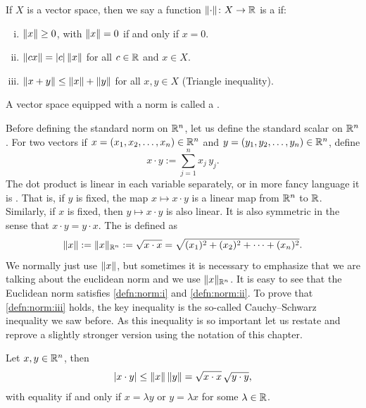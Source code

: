 \begin{defn}
If $X$ is a vector space, then we say
a function $\lVert {\cdot} \rVert \colon X \to {\mathbb{R}}$ is a
\emph{} if:
\begin{enumerate}[(i)]
\item \label{defn:norm:i} $\lVert {x} \rVert \geq 0$, with $\lVert {x} \rVert=0$ if and only if $x=0$.
\item \label{defn:norm:ii} $\lVert {cx} \rVert = \lvert {c} \rvert \, \lVert {x} \rVert$ for all $c \in {\mathbb{R}}$ and $x \in X$.
\item \label{defn:norm:iii} $\lVert {x+y} \rVert \leq \lVert {x} \rVert+\lVert {y} \rVert$ for all $x,y \in X$
\qquad (Triangle inequality).
\end{enumerate}
A vector space equipped with a norm is called a
\emph{}.
\end{defn}

Before defining the standard norm on ${\mathbb{R}}^n$, let us
define the standard 
scalar \emph{} on ${\mathbb{R}}^n$.  For two vectors
if $x=(x_1,x_2,\ldots,x_n) \in {\mathbb{R}}^n$
and $y=(y_1,y_2,\ldots,y_n) \in {\mathbb{R}}^n$, define
\begin{equation*}
x \cdot y := \sum_{j=1}^n x_j\, y_j .
\end{equation*}
The dot product is linear in each variable
separately, or in more fancy language it is \emph{}.
That is,
if $y$ is fixed, the map $x \mapsto x \cdot y$ is a linear map from
${\mathbb{R}}^n$ to ${\mathbb{R}}$.  Similarly, if $x$ is fixed, then
$y \mapsto x \cdot y$ is also linear.
It is also symmetric in the sense that $x \cdot y = y \cdot x$.
The \emph{} is defined as
\begin{equation*}
\lVert {x} \rVert := \lVert {x} \rVert_{{\mathbb{R}}^n} := \sqrt{x \cdot x} = \sqrt{(x_1)^2+(x_2)^2 + \cdots + (x_n)^2}.
\end{equation*}
We normally just use $\lVert {x} \rVert$, but sometimes it is necessary to
emphasize that we are talking about the euclidean norm and we use
$\lVert {x} \rVert_{{\mathbb{R}}^n}$.
It is easy to see that the Euclidean norm satisfies \ref{defn:norm:i} and
\ref{defn:norm:ii}.  To prove
that \ref{defn:norm:iii} holds, the key
inequality is the so-called Cauchy--Schwarz inequality
we saw before.  As this inequality is so important let us restate and
reprove a slightly stronger version using the notation of this chapter.

\begin{thm}
Let $x, y \in {\mathbb{R}}^n$, then
\begin{equation*}
\lvert {x \cdot y} \rvert \leq \lVert {x} \rVert \, \lVert {y} \rVert = \sqrt{x\cdot x}\, \sqrt{y\cdot y},
\end{equation*}
with equality if and only if $x = \lambda y$ or $y = \lambda x$ for some
$\lambda \in {\mathbb{R}}$.
\end{thm}

